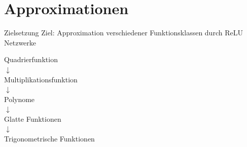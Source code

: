 \documentclass[10pt,aspectratio=169]{beamer}
\begin{document}
\section{Approximationen}

\begin{frame}{Zielsetzung}
    Ziel: Approximation verschiedener Funktionsklassen durch ReLU Netzwerke

    \begin{center}
        Quadrierfunktion \\ \pause
        \(\downarrow\) \\
        Multiplikationsfunktion \\ \pause
        \(\downarrow\) \\
        Polynome \\ \pause
        \(\downarrow\) \\
        Glatte Funktionen \\ \pause
        \(\downarrow\) \\
        Trigonometrische Funktionen
    \end{center}
\end{frame}
\end{document}
